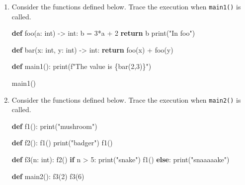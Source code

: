 \documentclass[]{article}
\newenvironment{Shaded}{}{}
\newcommand{\BuiltInTok}[1]{#1}
\newcommand{\ControlFlowTok}[1]{\textcolor[rgb]{0.00,0.44,0.13}{\textbf{#1}}}
\newcommand{\DecValTok}[1]{\textcolor[rgb]{0.25,0.63,0.44}{#1}}
\newcommand{\KeywordTok}[1]{\textcolor[rgb]{0.00,0.44,0.13}{\textbf{#1}}}
\newcommand{\NormalTok}[1]{#1}
\newcommand{\OperatorTok}[1]{\textcolor[rgb]{0.40,0.40,0.40}{#1}}
\newcommand{\SpecialCharTok}[1]{\textcolor[rgb]{0.25,0.44,0.63}{#1}}
\newcommand{\SpecialStringTok}[1]{\textcolor[rgb]{0.73,0.40,0.53}{#1}}
\newcommand{\StringTok}[1]{\textcolor[rgb]{0.25,0.44,0.63}{#1}}
\begin{document}
\begin{enumerate}
\def\labelenumi{\arabic{enumi}.}
\item
  Consider the functions defined below. Trace the execution when
  \texttt{main1()} is called.

\begin{Shaded}
\begin{Highlighting}[]
\KeywordTok{def}\NormalTok{ foo(a: }\BuiltInTok{int}\NormalTok{) }\OperatorTok{->} \BuiltInTok{int}\NormalTok{:}
\NormalTok{    b }\OperatorTok{=} \DecValTok{3}\OperatorTok{*}\NormalTok{a }\OperatorTok{+} \DecValTok{2}
    \ControlFlowTok{return}\NormalTok{ b}
    \BuiltInTok{print}\NormalTok{(}\StringTok{"In foo"}\NormalTok{)}

\KeywordTok{def}\NormalTok{ bar(x: }\BuiltInTok{int}\NormalTok{, y: }\BuiltInTok{int}\NormalTok{) }\OperatorTok{->} \BuiltInTok{int}\NormalTok{:}
    \ControlFlowTok{return}\NormalTok{ foo(x) }\OperatorTok{+}\NormalTok{ foo(y)}

\KeywordTok{def}\NormalTok{ main1():}
    \BuiltInTok{print}\NormalTok{(}\SpecialStringTok{f"The value is }\SpecialCharTok{\{}\NormalTok{bar(}\DecValTok{2}\NormalTok{,}\DecValTok{3}\NormalTok{)}\SpecialCharTok{\}}\SpecialStringTok{"}\NormalTok{)}

\NormalTok{main1()}
\end{Highlighting}
\end{Shaded}
\item
  Consider the functions defined below. Trace the execution when
  \texttt{main2()} is called.

\begin{Shaded}
\begin{Highlighting}[]
\KeywordTok{def}\NormalTok{ f1():}
    \BuiltInTok{print}\NormalTok{(}\StringTok{"mushroom"}\NormalTok{)}

\KeywordTok{def}\NormalTok{ f2():}
\NormalTok{    f1()}
    \BuiltInTok{print}\NormalTok{(}\StringTok{"badger"}\NormalTok{)}
\NormalTok{    f1()}

\KeywordTok{def}\NormalTok{ f3(n: }\BuiltInTok{int}\NormalTok{):}
\NormalTok{    f2()}
    \ControlFlowTok{if}\NormalTok{ n }\OperatorTok{>} \DecValTok{5}\NormalTok{:}
        \BuiltInTok{print}\NormalTok{(}\StringTok{"snake"}\NormalTok{)}
\NormalTok{        f1()}
    \ControlFlowTok{else}\NormalTok{:}
        \BuiltInTok{print}\NormalTok{(}\StringTok{"snaaaaake"}\NormalTok{)}

\KeywordTok{def}\NormalTok{ main2():}
\NormalTok{    f3(}\DecValTok{2}\NormalTok{)}
\NormalTok{    f3(}\DecValTok{6}\NormalTok{)}


\end{Highlighting}
\end{Shaded}
\end{enumerate}
\end{document}
